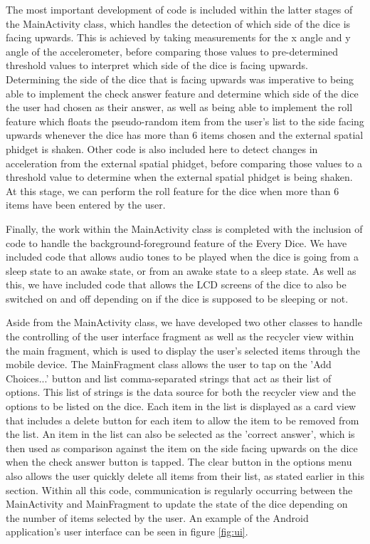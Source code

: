 \documentclass{sigchi}
\begin{document}
The most important development of code is included within the latter stages of the MainActivity class, which handles the detection of which side of the dice is facing upwards. This is achieved by taking measurements for the x angle and y angle of the accelerometer, before comparing those values to pre-determined threshold values to interpret which side of the dice is facing upwards. Determining the side of the dice that is facing upwards was imperative to being able to implement the check answer feature and determine which side of the dice the user had chosen as their answer, as well as being able to implement the roll feature which floats the pseudo-random item from the user's list to the side facing upwards whenever the dice has more than 6 items chosen and the external spatial phidget is shaken. Other code is also included here to detect changes in acceleration from the external spatial phidget, before comparing those values to a threshold value to determine when the external spatial phidget is being shaken. At this stage, we can perform the roll feature for the dice when more than 6 items have been entered by the user. 

Finally, the work within the MainActivity class is completed with the inclusion of code to handle the background-foreground feature of the Every Dice. We have included code that allows audio tones to be played when the dice is going from a sleep state to an awake state, or from an awake state to a sleep state. As well as this, we have included code that allows the LCD screens of the dice to also be switched on and off depending on if the dice is supposed to be sleeping or not.

Aside from the MainActivity class, we have developed two other classes to handle the controlling of the user interface fragment as well as the recycler view within the main fragment, which is used to display the user's selected items through the mobile device. The MainFragment class allows the user to tap on the 'Add Choices...' button and list comma-separated strings that act as their list of options. This list of strings is the data source for both the recycler view and the options to be listed on the dice. Each item in the list is displayed as a card view that includes a delete button for each item to allow the item to be removed from the list. An item in the list can also be selected as the 'correct answer', which is then used as comparison against the item on the side facing upwards on the dice when the check answer button is tapped. The clear button in the options menu also allows the user quickly delete all items from their list, as stated earlier in this section. Within all this code, communication is regularly occurring between the MainActivity and MainFragment to update the state of the dice depending on the number of items selected by the user. An example of the Android application's user interface can be seen in figure \ref{fig:ui}.
\end{document}
